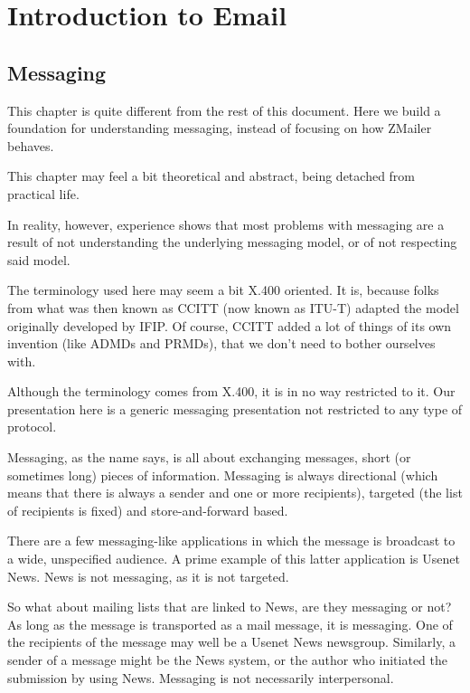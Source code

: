 
\section{Introduction to Email}

\subsection{Messaging}

This chapter is quite different from the rest of this document.
Here we build a foundation for understanding messaging, instead
of focusing on how ZMailer behaves.

This chapter may feel a bit theoretical and abstract, being detached
from practical life.

In reality, however, experience shows that most problems with messaging
are a result of not understanding the underlying messaging model, or of
not respecting said model.

The terminology used here may seem a bit X.400 oriented.
It is, because folks from what was then known as CCITT (now known as ITU-T)
adapted the model originally developed by IFIP.
Of course, CCITT added a lot of things of its own invention (like
ADMDs and PRMDs), that we don't need to bother ourselves with.

Although the terminology comes from X.400, it is in no way restricted to it.
Our presentation here is a generic messaging presentation not restricted
to any type of protocol.

Messaging, as the name says, is all about exchanging messages,
short (or sometimes long) pieces of information.
Messaging is always directional (which means that there is always
a sender and one or more recipients), targeted (the list of recipients
is fixed) and store-and-forward based.

There are a few messaging-like applications in which the message is
broadcast to a wide, unspecified audience.
A prime example of this latter application is Usenet News.
News is not messaging, as it is not targeted.

So what about mailing lists that are linked to News, are they messaging or not?
As long as the message is transported as a mail message, it is messaging.
One of the recipients of the message may well be a Usenet News newsgroup.
Similarly, a sender of a message might be the News system, or the author
who initiated the submission by using News. Messaging is not necessarily
interpersonal.

